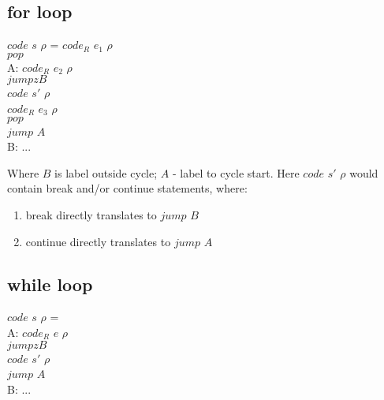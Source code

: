 \documentclass{report}
\begin{document}
\subsection{{\selectfont for} loop}
{\color{OliveGreen}$code$} $s$ $\rho$ =\hspace*{.35cm} {\color{OliveGreen}$code_R$} $e_1$ $\rho$\\
\hspace*{2cm} {\color{RoyalBlue}$pop$}\\
\hspace*{1.5cm} {\color{RoyalBlue}A:} {\color{OliveGreen}$code_R$} $e_2$ $\rho$\\
\hspace*{2cm} {\color{RoyalBlue}$jumpz B$}\\
\hspace*{2cm} {\color{OliveGreen}$code$} $s'$ $\rho$\\
\hspace*{2cm} {\color{OliveGreen}$code_R$} $e_3$ $\rho$\\
\hspace*{2cm} {\color{RoyalBlue}$pop$}\\
\hspace*{2cm} {\color{RoyalBlue}$jump$ $A$}\\
\hspace*{1.5cm} {\color{RoyalBlue}B:} ...

Where {\color{RoyalBlue}$B$} is label outside cycle; {\color{RoyalBlue}$A$} - label to cycle start. Here {\color{OliveGreen}$code$} $s'$ $\rho$ would contain {\selectfont break} and/or {\selectfont continue} statements, where:\\
\begin{enumerate}
\item {\selectfont break} directly translates to {\color{RoyalBlue}$jump$ $B$}
\item {\selectfont continue} directly translates to {\color{RoyalBlue}$jump$ $A$}
\end{enumerate}
\subsection{{\selectfont while} loop}
{\color{OliveGreen}$code$} $s$ $\rho$ =\\
\hspace*{1.5cm} {\color{RoyalBlue}A:} {\color{OliveGreen}$code_R$} $e$ $\rho$\\
\hspace*{2cm} {\color{RoyalBlue}$jumpz B$}\\
\hspace*{2cm} {\color{OliveGreen}$code$} $s'$ $\rho$\\
\hspace*{2cm} {\color{RoyalBlue}$jump$ $A$}\\
\hspace*{1.5cm} {\color{RoyalBlue}B:} ...
\end{document}
